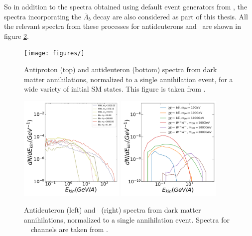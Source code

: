 So in addition to the spectra obtained using default event generators from \cite{}, the spectra incorporating the $\overline{\Lambda}_b$ decay are also considered as part of this thesis. All the relevant spectra from these processes for antideuterons and \ahe\ are shown in figure \ref{fig:DMsource_spectra}. \\ 
\begin{figure}[hbpt]
    \centering
    \texttt{[image: figures/]}
		\caption{Antiproton (top) and antideuteron (bottom) spectra from dark matter annihilations, normalized to a single annihilation event, for a wide variety of initial SM states. This figure is taken from \cite{}.}
    \label{fig:DMsource_spectra_other_channels}
\end{figure}
\begin{figure}[hbpt]
    \centering
    \includegraphics[width=0.45\textwidth]{figures/dbar_injectionSpectra.pdf}
    \includegraphics[width=0.45\textwidth]{figures/he3_dm_source_spectra.png}
    \caption{Antideuteron (left) and \ahe\ (right) spectra from dark matter annihilations, normalized to a single annihilation event. Spectra for \WW\ \bb\ channels are taken from \cite{Ibarra:2012cc}. }
    \label{fig:DMsource_spectra}
\end{figure}

